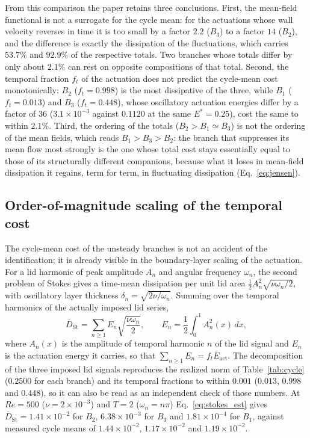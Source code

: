 \documentclass[11pt,a4paper]{article}
\newcommand{\Dbar}{\overline{D}}
\begin{document}
From this comparison the paper retains three conclusions. First, the
mean-field functional is not a surrogate for the cycle mean: for the actuations
whose wall velocity reverses in time it is too small by a factor $2.2$ ($B_3$) to
a factor $14$ ($B_2$), and the difference is exactly the dissipation of the
fluctuations, which carries $53.7\%$ and $92.9\%$ of the respective totals. Two
branches whose totals differ by only about $2.1\%$ can rest on opposite compositions of
that total. Second, the temporal fraction $f_t$ of the actuation does not predict
the cycle-mean cost monotonically: $B_2$ ($f_t=0.998$) is the most dissipative of
the three, while $B_1$ ($f_t=0.013$) and $B_3$ ($f_t=0.448$), whose oscillatory
actuation energies differ by a factor of $36$ ($3.1\times10^{-3}$ against
$0.1120$ at the same $E^\ast=0.25$), cost the same to within $2.1\%$.
Third, the ordering of the totals ($B_2>B_1\simeq B_3$) is not the ordering of the
mean fields, which reads $B_1>B_3>B_2$: the branch that suppresses its mean flow
most strongly is the one whose total cost stays essentially equal to those of its
structurally different companions, because what it loses in mean-field dissipation
it regains, term for term, in fluctuating dissipation
(Eq.~\eqref{eq:jensen}).

\subsection{Order-of-magnitude scaling of the temporal cost}
\label{sec:scaling}

The cycle-mean cost of the unsteady branches is not an accident of the
identification; it is already visible in the boundary-layer scaling of the
actuation. For a lid harmonic of peak amplitude $A_n$ and angular frequency
$\omega_n$, the second problem of Stokes gives a time-mean dissipation per unit
lid area $\tfrac12 A_n^2\sqrt{\nu\omega_n/2}$, with oscillatory layer thickness
$\delta_n=\sqrt{2\nu/\omega_n}$. Summing over the temporal harmonics of the
actually imposed lid series,
\begin{equation}
\Dbar_{\mathrm{St}}=\sum_{n\ge1}E_n\sqrt{\frac{\nu\omega_n}{2}},
\qquad
E_n=\frac12\int_0^1 A_n^2(x)\,dx ,
\label{eq:stokes_est}
\end{equation}
where $A_n(x)$ is the amplitude of temporal harmonic $n$ of the lid signal and
$E_n$ is the actuation energy it carries, so that
$\sum_{n\ge1}E_n=f_t\overline{E}_{\mathrm{act}}$. The decomposition of the
three imposed lid signals reproduces the realized norm of Table~\ref{tab:cycle}
($0.2500$ for each branch) and its temporal fractions to within $0.001$ ($0.013$,
$0.998$ and $0.448$), so it can also be read as an independent check of those
numbers. At $Re=500$ ($\nu=2\times10^{-3}$) and $T=2$ ($\omega_n=n\pi$)
Eq.~\eqref{eq:stokes_est} gives $\Dbar_{\mathrm{St}}=1.41\times10^{-2}$ for $B_2$,
$6.38\times10^{-3}$ for $B_3$ and $1.81\times10^{-4}$ for $B_1$, against measured
cycle means of $1.44\times10^{-2}$, $1.17\times10^{-2}$ and
$1.19\times10^{-2}$.
\end{document}
